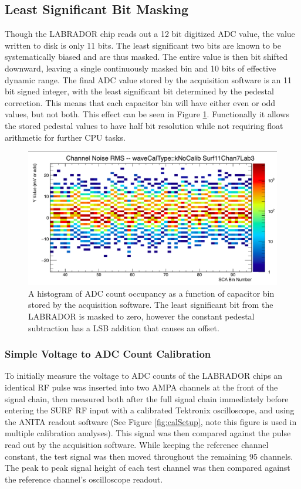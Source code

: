 	\subsection{Least Significant Bit Masking}
		Though the LABRADOR chip reads out a 12 bit digitized ADC value, the value written to disk is only 11 bits. The least significant two bits are known to be systematically biased and are thus masked.  The entire value is then bit shifted downward, leaving a single continuously masked bin and 10 bits of effective dynamic range.  The final ADC value stored by the acquisition software is an 11 bit signed integer, with the least significant bit determined by the pedestal correction.  This means that each capacitor bin will have either even or odd values, but not both.  This effect can be seen in Figure \ref{fig:evenOddPeds}.  Functionally it allows the stored pedestal values to have half bit resolution while not requiring float arithmetic for further CPU tasks.
		
		
	\begin{figure}
		\includegraphics[width=\textwidth]{figures/pedsEvenOdd}
		\caption{A histogram of ADC count occupancy as a function of capacitor bin stored by the acquisition software.  The least significant bit from the LABRADOR is masked to zero, however the constant pedestal subtraction has a LSB addition that causes an offset.}
		\label{fig:evenOddPeds}
	\end{figure}
		
	
	
	\subsubsection{Simple Voltage to ADC Count Calibration}
	To initially measure the voltage to ADC counts of the LABRADOR chips an identical RF pulse was inserted into two AMPA channels at the front of the signal chain, then measured both after the full signal chain immediately before entering the SURF RF input with a calibrated Tektronix oscilloscope, and using the ANITA readout software (See Figure \ref{fig:calSetup}, note this figure is used in multiple calibration analyses). This signal was then compared against the pulse read out by the acquisition software.  While keeping the reference channel constant, the test signal was then moved throughout the remaining 95 channels.  The peak to peak signal height of each test channel was then compared against the reference channel's oscilloscope readout.
		
